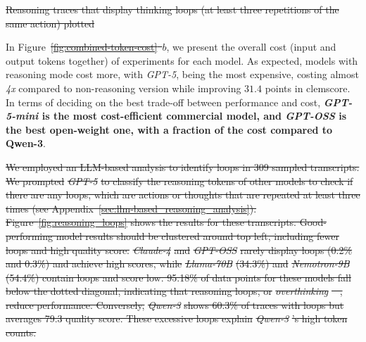 \documentclass[11pt]{article}
\providecommand{\DIFadd}[1]{{\protect\color{blue}\uwave{#1}}} %
\providecommand{\DIFdel}[1]{{\protect\color{red}\sout{#1}}}                      %
\providecommand{\DIFaddbegin}{} %
\providecommand{\DIFaddend}{} %
\providecommand{\DIFdelbegin}{} %
\providecommand{\DIFdelend}{} %
\providecommand{\DIFdelFL}[1]{\DIFdel{#1}} %
\newcommand{\DIFscaledelfig}{0.5}
\newlength{\DIFdelgraphicswidth} %
\newlength{\DIFdelgraphicsheight} %
\newcommand{\DIFaddincludegraphics}[2][]{{\color{blue}\fbox{\DIFOincludegraphics[#1]{#2}}}} %
\newcommand{\DIFdelincludegraphics}[2][]{%
\sbox{\DIFdelgraphicsbox}{\DIFOincludegraphics[#1]{#2}}%
\settoboxwidth{\DIFdelgraphicswidth}{\DIFdelgraphicsbox} %
\settoboxtotalheight{\DIFdelgraphicsheight}{\DIFdelgraphicsbox} %
\scalebox{\DIFscaledelfig}{%
\parbox[b]{\DIFdelgraphicswidth}{\usebox{\DIFdelgraphicsbox}\\[-\baselineskip] \rule{\DIFdelgraphicswidth}{0em}}\llap{\resizebox{\DIFdelgraphicswidth}{\DIFdelgraphicsheight}{%
\setlength{\unitlength}{\DIFdelgraphicswidth}%
\begin{picture}(1,1)%
\thicklines\linethickness{2pt} %
{\color[rgb]{1,0,0}\put(0,0){\framebox(1,1){}}}%
{\color[rgb]{1,0,0}\put(0,0){\line( 1,1){1}}}%
{\color[rgb]{1,0,0}\put(0,1){\line(1,-1){1}}}%
\end{picture}%
}\hspace*{3pt}}} %
} %
\DeclareRobustCommand{\DIFaddbegin}{\DIFOaddbegin \let\includegraphics\DIFaddincludegraphics} %
\DeclareRobustCommand{\DIFaddend}{\DIFOaddend \let\includegraphics\DIFOincludegraphics} %
\DeclareRobustCommand{\DIFdelbegin}{\DIFOdelbegin \let\includegraphics\DIFdelincludegraphics} %
\DeclareRobustCommand{\DIFdelend}{\DIFOaddend \let\includegraphics\DIFOincludegraphics} %
\begin{document}
\DIFdelbegin %
{%
\DIFdelFL{Reasoning traces that display thinking loops (at least three repetitions of the same action) plotted}}

\DIFdelend In Figure~\DIFdelbegin \DIFdel{\ref{fig:combined-token-cost}~$b$}\DIFdelend \DIFaddbegin \DIFadd{\ref{fig:cost_average}}\DIFaddend , we present the overall cost (input and output tokens together) of experiments for each model. As expected, models with reasoning mode cost more, with \textit{GPT-5}, being the most expensive, costing almost \textit{4x} compared to non-reasoning version while improving $31.4$ points in clemscore. In terms of deciding on the best trade-off between performance and cost, \textbf{\textit{GPT-5-mini} is the most cost-efficient commercial model, and \textit{GPT-OSS} is the best open-weight one, with a fraction of the cost compared to Qwen-3}.







\DIFdelbegin \DIFdel{We employed an LLM-based analysis to identify loops in 309 sampled transcripts. We prompted }\textit{\DIFdel{GPT-5}} %
\DIFdel{to classify the reasoning tokens of other models to check if there are any loops, which are actions or thoughts that are repeated at least three times (see Appendix~\ref{sec:llm-based_reasoning_analysis}). Figure~\ref{fig:reasoning_loops} shows the results for these transcripts. Good-performing model results should be clustered around top left, including fewer loops and high quality score. }\textit{\DIFdel{Claude-4}} %
\DIFdel{and }\textit{\DIFdel{GPT-OSS}} %
\DIFdel{rarely display loops (0.2\% and 0.3\%) and achieve high scores, while }\textit{\DIFdel{Llama-70B}} %
\DIFdel{(34.3\%) and }\textit{\DIFdel{Nemotron-9B}} %
\DIFdel{(54.4\%) contain loops and score low. 95.18\% of data points for these models fall below the dotted diagonal, indicating that reasoning loops, or }\textit{\DIFdel{overthinking}} %
\DIFdel{\mbox{%
\cite{DBLP:journals/corr/abs-2506-06941}}\hskip0pt%
, reduce performance.
Conversely, }\textit{\DIFdel{Qwen-3}} %
\DIFdel{shows 60.3\% of traces with loops but averages 79.3 quality score. These excessive loops explain }\textit{\DIFdel{Qwen-3}}%
\DIFdel{'s high token counts.
}%
\end{document}
